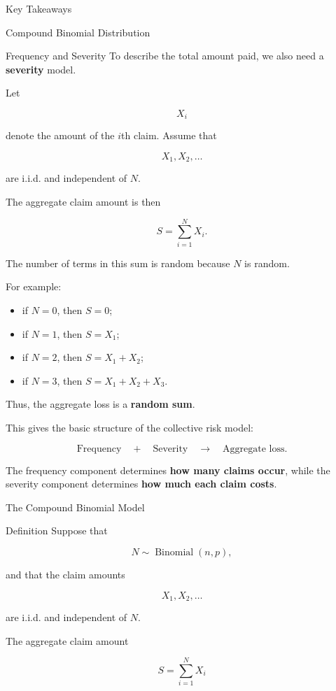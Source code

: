 \documentclass[
  ignorenonframetext,
  aspectratio=169,
]{beamer}
\providecommand{\tightlist}{%
  \setlength{\itemsep}{0pt}\setlength{\parskip}{0pt}}
\begin{document}
\begin{frame}{Key Takeaways}
\begin{block}{Compound Binomial Distribution}
\begin{block}{Frequency and Severity}
To describe the total amount paid, we also need a \textbf{severity}
model.

Let

\[
X_i
\]

denote the amount of the \(i\)th claim. Assume that

\[
X_1,X_2,\ldots
\]

are i.i.d. and independent of \(N\).

The aggregate claim amount is then

\[
S=\sum_{i=1}^{N}X_i.
\]

The number of terms in this sum is random because \(N\) is random.

For example:

\begin{itemize}
\tightlist
\item
  if \(N=0\), then \(S=0\);
\item
  if \(N=1\), then \(S=X_1\);
\item
  if \(N=2\), then \(S=X_1+X_2\);
\item
  if \(N=3\), then \(S=X_1+X_2+X_3\).
\end{itemize}

Thus, the aggregate loss is a \textbf{random sum}.

This gives the basic structure of the collective risk model:

\[
\boxed{
\text{Frequency}
\quad+\quad
\text{Severity}
\quad\longrightarrow\quad
\text{Aggregate loss}.
}
\]

The frequency component determines \textbf{how many claims occur}, while
the severity component determines \textbf{how much each claim costs}.
\end{block}
\end{block}

\begin{block}{The Compound Binomial Model}
\protect{}\label{the-compound-binomial-model-1}
\begin{block}{Definition}
\protect{}\label{definition}
Suppose that

\[
N\sim\operatorname{Binomial}(n,p),
\]

and that the claim amounts

\[
X_1,X_2,\ldots
\]

are i.i.d. and independent of \(N\).

The aggregate claim amount

\[
\boxed{
S=\sum_{i=1}^{N}X_i
}
\]


\end{block}
\end{block}
\end{frame}
\end{document}
